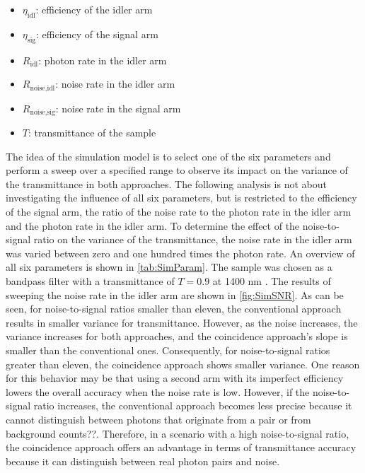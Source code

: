 \begin{itemize}[topsep=0pt, partopsep=0pt, itemsep=1.5pt, parsep=0pt, leftmargin=3em]
	\item $\eta_{\text{idl}}$: efficiency of the idler arm
	\item $\eta_{\text{sig}}$: efficiency of the signal arm
	\item $R_{\text{idl}}$: photon rate in the idler arm
	\item $R_{\text{noise,idl}}$: noise rate in the idler arm
	\item $R_{\text{noise,sig}}$: noise rate in the signal arm
	\item $T$: transmittance of the sample 
\end{itemize}
The idea of the simulation model is to select one of the six parameters and perform a sweep over a specified range to observe its impact on the variance of the transmittance in both approaches. The following analysis is not about investigating the influence of all six parameters, but is restricted to the efficiency of the signal arm, the ratio of the noise rate to the photon rate in the idler arm and the photon rate in the idler arm.
To determine the effect of the noise-to-signal ratio on the variance of the transmittance, the noise rate in the idler arm was varied between zero and one hundred times the photon rate. An overview of all six parameters is shown in \autoref{tab:SimParam}. The sample was chosen as a bandpass filter with a transmittance of $T=0.9$ at 1400 nm \cite{ThorlabsFBH140012HardCoated}.\newline
The results of sweeping the noise rate in the idler arm are shown in \autoref{fig:SimSNR}. As can be seen, for noise-to-signal ratios smaller than eleven, the conventional approach results in smaller variance for transmittance. However, as the noise increases, the variance increases for both approaches, and the coincidence approach's slope is smaller than the conventional ones. Consequently, for noise-to-signal ratios greater than eleven, the coincidence approach shows smaller variance. One reason for this behavior may be that using a second arm with its imperfect efficiency lowers the overall accuracy when the noise rate is low. However, if the noise-to-signal ratio increases, the conventional approach becomes less precise because it cannot distinguish between photons that originate from a pair or from background counts??. Therefore, in a scenario with a high noise-to-signal ratio, the coincidence approach offers an advantage in terms of transmittance accuracy because it can distinguish between real photon pairs and noise.
